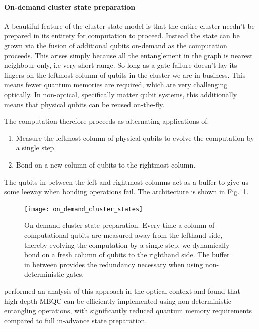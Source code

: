 %
%

\paragraph{On-demand cluster state preparation}

A beautiful feature of the cluster state model is that the entire cluster needn't be prepared in its entirety for computation to proceed. Instead the state can be grown via the fusion of additional qubits on-demand as the computation proceeds. This arises simply because all the entanglement in the graph is nearest neighbour only, i.e very short-range. So long as a gate failure doesn't lay its fingers on the leftmost column of qubits in the cluster we are in business. This means fewer quantum memories are required, which are very challenging optically. In non-optical, specifically matter qubit systems, this additionally means that physical qubits can be reused on-the-fly.

The computation therefore proceeds as alternating applications of:
\begin{enumerate}
	\item Measure the leftmost column of physical qubits to evolve the computation by a single step.
	\item Bond on a new column of qubits to the rightmost column.
\end{enumerate}
The qubits in between the left and rightmost columns act as a buffer to give us some leeway when bonding operations fail. The architecture is shown in Fig.~\ref{fig:on_demand_cs}.

\begin{figure}[!htbp]
\texttt{[image: on\_demand\_cluster\_states]}
\captionspacefig \caption{On-demand cluster state preparation. Every time a column of computational qubits are measured away from the lefthand side, thereby evolving the computation by a single step, we dynamically bond on a fresh column of qubits to the righthand side. The buffer in between provides the redundancy necessary when using non-deterministic gates.}\label{fig:on_demand_cs}
\end{figure}

\cite{KokBuffer} performed an analysis of this approach in the optical context and found that high-depth MBQC can be efficiently implemented using non-deterministic entangling operations, with significantly reduced quantum memory requirements compared to full in-advance state preparation.

